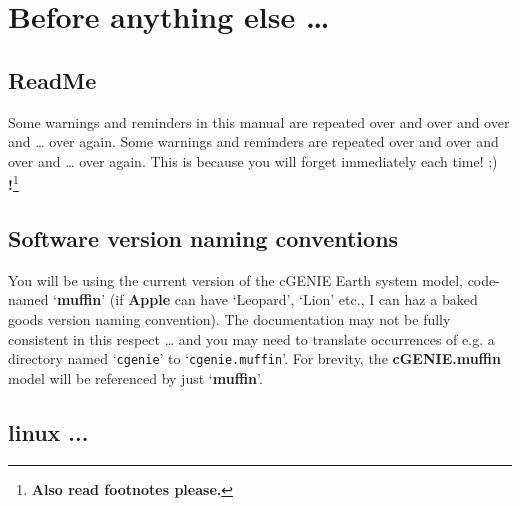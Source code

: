 \documentclass[11pt,fleqn]{book} %
\begin{document}

\newpage


\section{Before anything else …}


\subsection*{ReadMe}

Some warnings and reminders in this manual are repeated over and over and over and … over again.
Some warnings and reminders are repeated over and over and over and … over again.
This is because you will forget immediately each time! ;)
\\\textbf{!}\footnote{\textbf{Also read footnotes please.}}


\subsection*{Software version naming conventions}

You will be using the current version of the cGENIE Earth system model, code-named ‘\textbf{muffin}’ (if \textbf{Apple} can have ‘Leopard’, ‘Lion’ etc., I can haz a baked goods version naming convention). The documentation may not be fully consistent in this respect … and you may need to translate occurrences of e.g. a directory named ‘\texttt{cgenie}’ to ‘\texttt{cgenie.muffin}’. For brevity, the \textbf{cGENIE.muffin} model will be referenced by just ‘\textbf{muffin}’.


\subsection*{linux ...}
\end{document}

